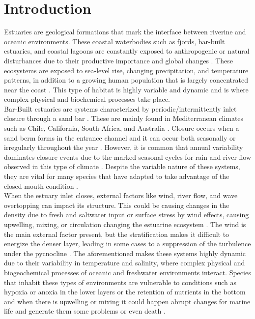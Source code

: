\documentclass[tesis.tex]{subfiles}
\begin{document}
\section{Introduction}
Estuaries are geological formations that mark the interface between riverine and oceanic environments. These coastal waterbodies such as fjords, bar-built estuaries, and coastal lagoons are constantly exposed to anthropogenic or natural disturbances due to their productive importance \citep{schernewski2002baltic, martinez2007coasts} and global changes \citep{grez2020evidence}. These ecosystems are exposed to sea-level rise, changing precipitation, and temperature patterns, in addition to a growing human population that is largely concentrated near the coast \citep{neumann2015future}. This type of habitat is highly variable and dynamic and is where complex physical and biochemical processes take place.\\
    
Bar-Built estuaries are systems characterized by periodic/intermittently inlet closure through a sand bar \citep{whitfield2007review}. These are mainly found in Mediterranean climates such as Chile, California, South Africa, and Australia \citep{mcsweeney2017intermittently}. Closure occurs when a sand berm forms in the entrance channel and it can occur both seasonally or irregularly throughout the year \citep{Behrens2013}. However, it is common that annual variability dominates closure events due to the marked seasonal cycles for rain and river flow observed in this type of climate \citep{Ranasinghe2003}. Despite the variable nature of these systems, they are vital for many species that have adapted to take advantage of the closed-mouth condition \citep{viaroli2008community}.\\

When the estuary inlet closes, external factors like wind, river flow, and wave overtopping can impact its structure. This could be causing changes in the density due to fresh and saltwater input or surface stress by wind effects, causing upwelling, mixing, or circulation changing the estuarine ecosystem \citep{Ranasinghe1999}.  The wind is the main external factor present, but the stratification makes it difficult to energize the denser layer, leading in some cases to a suppression of the turbulence under the pycnocline \citep{Cousins2010}. The aforementioned makes these systems highly dynamic due to their variability in temperature and salinity, where complex physical and biogeochemical processes of oceanic and freshwater environments interact. Species that inhabit these types of environments are vulnerable to conditions such as hypoxia or anoxia in the lower layers \citep{Kelly2018} or the retention of nutrients in the bottom \citep{Cousins2010} and when there is upwelling or mixing it could happen abrupt changes for marine life and generate them some problems or even death \citep{marti2008relating}.\\
\end{document}
